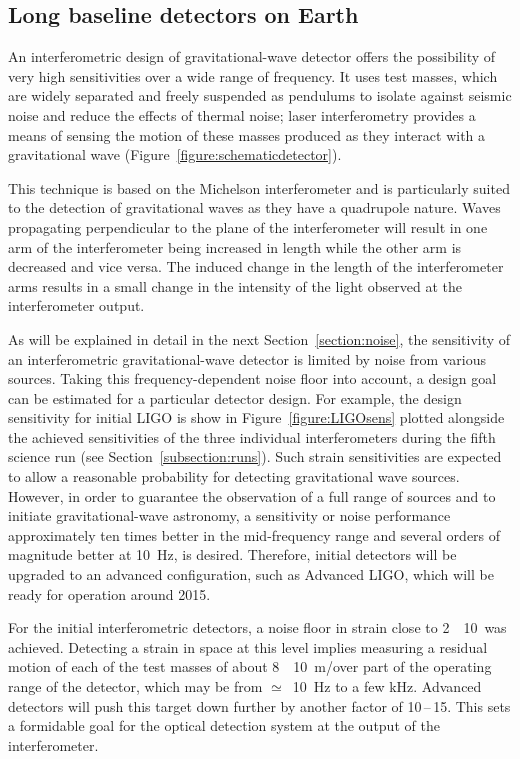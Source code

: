 \subsection{Long baseline detectors on Earth}
\label{subsection:earth} 

An interferometric design of gravitational-wave detector offers the possibility
of very high sensitivities over a wide range of frequency. It uses test masses,
which are widely separated and freely suspended as pendulums to isolate against
seismic noise and reduce the effects of thermal noise; laser interferometry
provides a means of sensing the motion of these masses produced as they interact
with a gravitational wave (Figure~\ref{figure:schematicdetector}).

  This technique is based on the Michelson interferometer and is particularly
suited to the detection of gravitational waves as they have a quadrupole nature.
Waves propagating perpendicular to the plane of the interferometer will result
in one arm of the interferometer being increased in length while the other arm
is decreased and vice versa. The induced change in the length of the
interferometer arms results in a small change in the intensity of the light
observed at the interferometer output.


As will be explained in detail in the next Section~\ref{section:noise},
the sensitivity of an interferometric gravitational-wave detector is
limited by noise from various sources. Taking this frequency-dependent
noise floor into account, a design goal can be estimated for a
particular detector design. For example, the design sensitivity for
initial LIGO is show in Figure~\ref{figure:LIGOsens} plotted alongside
the achieved sensitivities of the three individual interferometers
during the fifth science run (see Section~\ref{subsection:runs}). Such
strain sensitivities are expected to allow a reasonable probability
for detecting gravitational wave sources. However, in order to
guarantee the observation of a full range of sources and to initiate
gravitational-wave astronomy, a sensitivity or noise performance
approximately ten times better in the mid-frequency range and several
orders of magnitude better at 10~Hz, is desired. Therefore, initial
detectors will be upgraded to an advanced configuration, such as
Advanced LIGO, which will be ready for operation around 2015.

  For the initial interferometric detectors, a noise floor in strain
close to 2~\texttimes~10~\Hz was achieved. Detecting a
strain in space at this level implies measuring a residual motion of
each of the test masses of about 8~\texttimes~10~m/\Hz over
part of the operating range of the detector, which may be from
$\simeq$~10~Hz to a few kHz. Advanced detectors will push this
target down further by another factor of 10\,--\,15. This sets a
formidable goal for the optical detection system at the output of the
interferometer.
